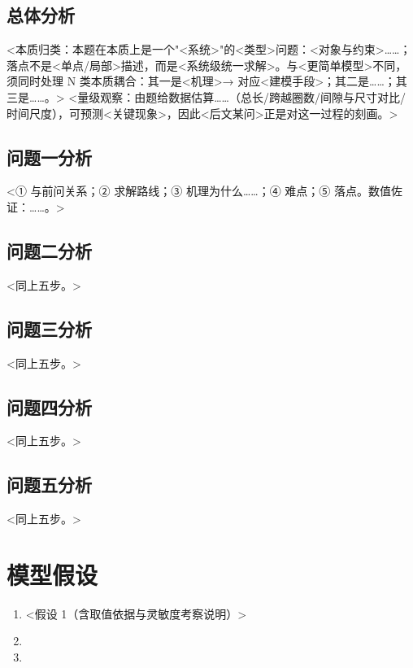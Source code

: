 \documentclass[11pt]{ctexart}
\begin{document}
\subsection{总体分析}
<本质归类：本题在本质上是一个"<系统>"的<类型>问题：<对象与约束>……；落点不是<单点/局部>描述，而是<系统级统一求解>。与<更简单模型>不同，须同时处理 N 类本质耦合：其一是<机理>→ 对应<建模手段>；其二是……；其三是……。>
<量级观察：由题给数据估算……（总长/跨越圈数/间隙与尺寸对比/时间尺度），可预测<关键现象>，因此<后文某问>正是对这一过程的刻画。>

\subsection{问题一分析}
<① 与前问关系；② 求解路线；③ 机理为什么……；④ 难点；⑤ 落点。数值佐证：……。>

\subsection{问题二分析}
<同上五步。>

\subsection{问题三分析}
<同上五步。>

\subsection{问题四分析}
<同上五步。>

\subsection{问题五分析}
<同上五步。>

\section{模型假设}
\begin{enumerate}[leftmargin=2em,itemsep=1pt]
\item <假设 1（含取值依据与灵敏度考察说明）>
\item <假设 2>
\item <假设 3>
\end{enumerate}
\end{document}
